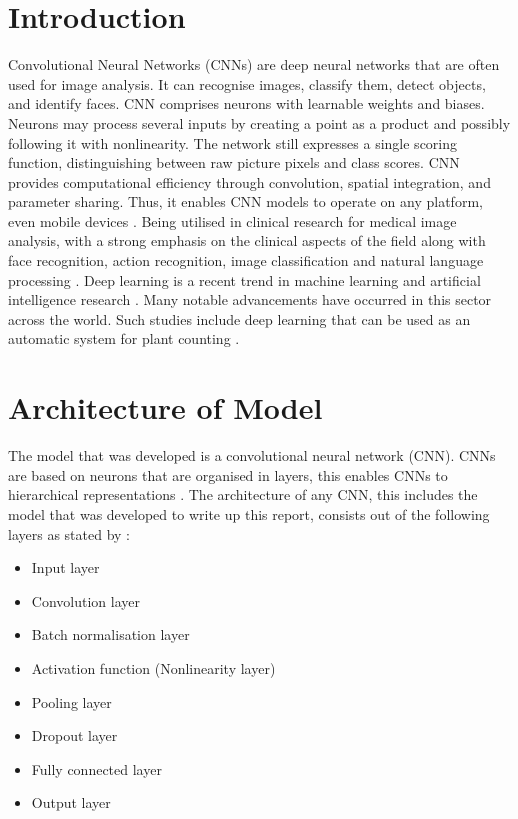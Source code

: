 \documentclass[a4paper,oneside,11pt]{book}
\begin{document}
\MakeTitle 
{} 
\tableofcontents
\cleardoublepage
\setcounter{page}{2}
\listoffigures
\cleardoublepage 
{} 

\pagestyle{plain}
\chapter[Introduction]{Introduction}

Convolutional Neural Networks (CNNs) are deep neural networks that are often used for image analysis. It can recognise images, classify them, detect objects, and identify faces. CNN comprises neurons with learnable weights and biases. Neurons may process several inputs by creating a point as a product and possibly following it with nonlinearity. The network still expresses a single scoring function, distinguishing between raw picture pixels and class scores. CNN provides computational efficiency through convolution, spatial integration, and parameter sharing. Thus, it enables CNN models to operate on any platform, even mobile devices \citep{valentino2021design}. Being utilised in clinical research for medical image analysis, with a strong emphasis on the clinical aspects of the field \citep{singha2021deep} along with face recognition, action recognition, image classification and natural language processing \citep{shamsaldin2019study}. Deep learning is a recent trend in machine learning and artificial intelligence research \citep{wang2020recent}. Many notable advancements have occurred in this sector across the world. Such studies include deep learning that can be used as an automatic system for plant counting \citep{cenggoro2018information} \citep{rahutomo2019artificial}.

\chapter[Architecture of Model]{Architecture of Model}

The model that was developed is a convolutional neural network (CNN). CNNs are based on neurons that are organised in layers, this enables CNNs to hierarchical representations \citep{kattenborn2021review}. The architecture of any CNN, this includes the model that was developed to write up this report, consists out of the following layers as stated by \cite{bhatt2021cnn}: 
\begin{itemize}
    \item Input layer
    \item Convolution layer
    \item Batch normalisation layer
    \item Activation function (Nonlinearity layer)
    \item Pooling layer
    \item Dropout layer
    \item Fully connected layer
    \item Output layer
\end{itemize}
\end{document}

